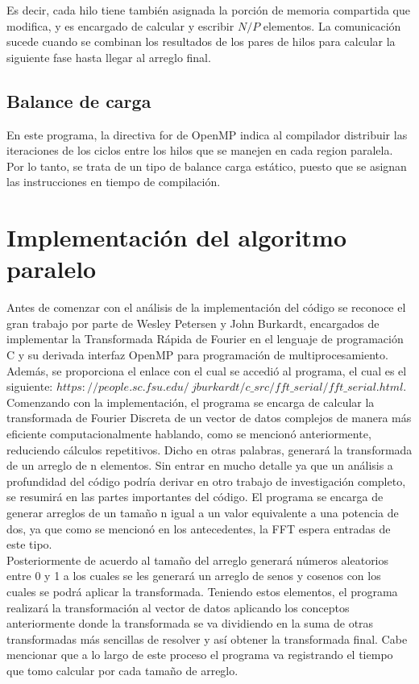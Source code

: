 \documentclass{article}
\begin{document}
Es decir, cada hilo tiene también asignada la porción de memoria compartida que modifica, y es encargado de calcular y escribir $N/P$ elementos. La comunicación sucede cuando se combinan los resultados de los pares de hilos para calcular la siguiente fase hasta llegar al arreglo final.
\subsection{Balance de carga}
En este programa, la directiva for de OpenMP indica al compilador distribuir las iteraciones de los ciclos entre los hilos que se manejen en cada region paralela. Por lo tanto, se trata de un tipo de balance carga estático, puesto que se asignan las instrucciones en tiempo de compilación.
\newpage
\section{Implementación del algoritmo paralelo}

Antes de comenzar con el análisis de la implementación del código se reconoce el gran trabajo por parte de Wesley Petersen y John Burkardt, encargados de implementar la Transformada Rápida de Fourier en el lenguaje de programación C y su derivada interfaz OpenMP para programación de multiprocesamiento.  
Además, se proporciona el enlace con el cual se accedió al programa, el cual es el siguiente: $https://people.sc.fsu.edu/~jburkardt/c\_src/fft\_serial/fft\_serial.html.$\\

Comenzando con la implementación, el programa se encarga de calcular la transformada de Fourier Discreta de un vector de datos complejos de manera más eficiente computacionalmente hablando, como se mencionó anteriormente, reduciendo cálculos repetitivos. Dicho en otras palabras, generará la transformada de un arreglo de n elementos. Sin entrar en mucho detalle ya que un análisis a profundidad del código podría derivar en otro trabajo de investigación completo, se resumirá en las partes importantes del código.
El programa se encarga de generar arreglos de un tamaño n igual a un valor equivalente a una potencia de dos, ya que como se mencionó en los antecedentes, la FFT espera entradas de este tipo. \\

Posteriormente de acuerdo al tamaño del arreglo generará números aleatorios entre 0 y 1 a los cuales se les generará un arreglo de senos y cosenos con los cuales se podrá aplicar la transformada. Teniendo estos elementos, el programa realizará la transformación al vector de datos aplicando los conceptos anteriormente donde la transformada se va dividiendo en la suma de otras transformadas más sencillas de resolver y así obtener la transformada final. Cabe mencionar que a lo largo de este proceso el programa va registrando el tiempo que tomo calcular por cada tamaño de arreglo.\\
\end{document}
